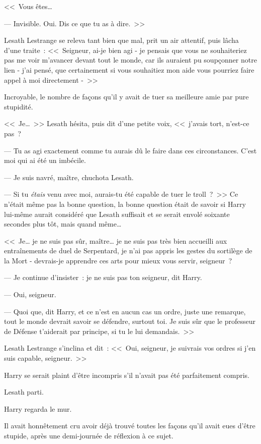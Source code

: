 <<~Vous êtes…

--- Invisible. Oui. Dis ce que tu as à dire.~>>

Lesath Lestrange se releva tant bien que mal, prit un air attentif, puis lâcha d'une traite~: <<~Seigneur, ai-je bien agi - je pensais que vous ne souhaiteriez pas me voir m'avancer devant tout le monde, car ils auraient pu soupçonner notre lien - j'ai pensé, que certainement si vous souhaitiez mon aide vous pourriez faire appel à moi directement -~>>

Incroyable, le nombre de façons qu'il y avait de tuer sa meilleure amie par pure stupidité.

<<~Je…~>> Lesath hésita, puis dit d'une petite voix, <<~j'avais tort, n'est-ce pas~?

--- Tu as agi exactement comme tu aurais dû le faire dans ces circonstances. C'est moi qui ai été un imbécile.

--- Je suis navré, maître, chuchota Lesath.

--- Si tu \emph{étais} venu avec moi, aurais-tu été capable de tuer le troll~?~>> Ce n'était même pas la bonne question, la bonne question était de savoir si Harry lui-même aurait considéré que Lesath suffisait et se serait envolé soixante secondes plus tôt, mais quand même…

<<~Je… je ne suis pas sûr, maître… je ne suis pas très bien accueilli aux entraînements de duel de Serpentard, je n'ai pas appris les gestes du sortilège de la Mort - devrais-je apprendre ces arts pour mieux vous servir, seigneur~?

--- Je continue d'insister~: je ne suis pas ton seigneur, dit Harry.

--- Oui, seigneur.

--- Quoi que, dit Harry, et ce n'est en aucun cas un ordre, juste une remarque, tout le monde devrait savoir se défendre, surtout toi. Je suis sûr que le professeur de Défense t'aiderait par principe, si tu le lui demandais.~>>

Lesath Lestrange s'inclina et dit~: <<~Oui, seigneur, je suivrais vos ordres si j'en suis capable, seigneur.~>>

Harry se serait plaint d'être incompris s'il n'avait pas été parfaitement compris.

Lesath parti.

Harry regarda le mur.

Il avait honnêtement cru avoir déjà trouvé toutes les façons qu'il avait eues d'être stupide, après une demi-journée de réflexion à ce sujet.

